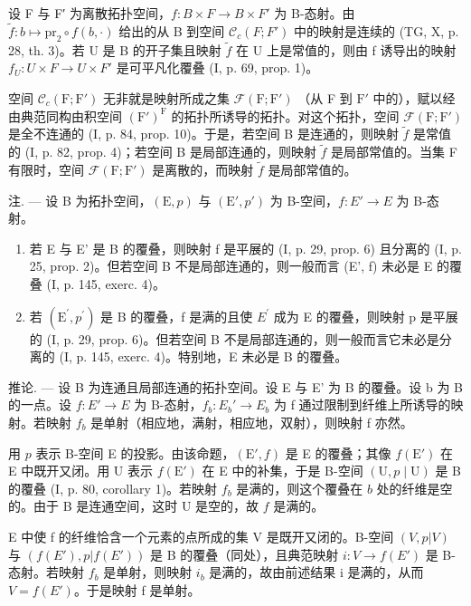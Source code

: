 设 F 与 F′ 为离散拓扑空间，\(f: B \times F \to B \times F'\) 为 B-态射。由 \(\widetilde{f}: b \mapsto \mathrm{pr}_{2} \circ f(b, \cdot)\) 给出的从 B 到空间 \(\mathcal{C}_{c}(F; F')\) 中的映射是连续的 (TG, X, p. 28, th. 3)。若 U 是 B 的开子集且映射 \(\widetilde{f}\) 在 U 上是常值的，则由 f 诱导出的映射 \(f_{U}: U \times F \to U \times F'\) 是可平凡化覆叠 (I, p. 69, prop. 1)。

空间 \(\mathcal{C}_c(\mathrm{F};\mathrm{F}')\) 无非就是映射所成之集 \(\mathcal{F}(\mathrm{F};\mathrm{F}')\) （从 F 到 \(\mathrm{F}'\) 中的），赋以经由典范同构由积空间 \((\mathrm{F}')^{\mathrm{F}}\) 的拓扑所诱导的拓扑。对这个拓扑，空间 \(\mathcal{F}(\mathrm{F};\mathrm{F}')\) 是全不连通的 (I, p. 84, prop. 10)。于是，若空间 B 是连通的，则映射 \(\widetilde{f}\) 是常值的 (I, p. 82, prop. 4)；若空间 B 是局部连通的，则映射 \(\widetilde{f}\) 是局部常值的。当集 F 有限时，空间 \(\mathcal{F}(\mathrm{F};\mathrm{F}')\) 是离散的，而映射 \(\widetilde{f}\) 是局部常值的。

注. --- 设 B 为拓扑空间，\((\mathrm{E}, p)\) 与 \((\mathrm{E}', p')\) 为 B-空间，\(f: E' \to E\) 为 B-态射。

\begin{enumerate}
\def\labelenumi{\alph{enumi})}
\item
  若 E 与 E' 是 B 的覆叠，则映射 f 是平展的 (I, p. 29, prop. 6) 且分离的 (I, p. 25, prop. 2)。但若空间 B 不是局部连通的，则一般而言 (E', f) 未必是 E 的覆叠 (I, p. 145, exerc. 4)。
\item
  若 \((\mathrm{E}^{\prime}, p^{\prime})\) 是 B 的覆叠，f 是满的且使 \(E^{\prime}\) 成为 E 的覆叠，则映射 p 是平展的 (I, p. 29, prop. 6)。但若空间 B 不是局部连通的，则一般而言它未必是分离的 (I, p. 145, exerc. 4)。特别地，E 未必是 B 的覆叠。
\end{enumerate}

推论. --- 设 B 为连通且局部连通的拓扑空间。设 E 与 E' 为 B 的覆叠。设 b 为 B 的一点。设 \(f: E' \to E\) 为 B-态射，\(f_{b}: E_{b}' \to E_{b}\) 为 f 通过限制到纤维上所诱导的映射。若映射 \(f_{b}\) 是单射（相应地，满射，相应地，双射），则映射 f 亦然。

用 \(p\) 表示 B-空间 E 的投影。由该命题，\((\mathrm{E}', f)\) 是 E 的覆叠；其像 \(f(\mathrm{E}')\) 在 E 中既开又闭。用 U 表示 \(f(\mathrm{E}')\) 在 E 中的补集，于是 B-空间 \((\mathrm{U}, p \mid \mathrm{U})\) 是 B 的覆叠 (I, p. 80, corollary 1)。若映射 \(f_b\) 是满的，则这个覆叠在 \(b\) 处的纤维是空的。由于 B 是连通空间，这时 U 是空的，故 \(f\) 是满的。

E 中使 f 的纤维恰含一个元素的点所成的集 V 是既开又闭的。B-空间 \((V, p|V)\) 与 \((f(E'), p|f(E'))\) 是 B 的覆叠（同处），且典范映射 \(i: V \to f(E')\) 是 B-态射。若映射 \(f_b\) 是单射，则映射 \(i_b\) 是满的，故由前述结果 i 是满的，从而 \(V = f(E')\)。于是映射 f 是单射。

